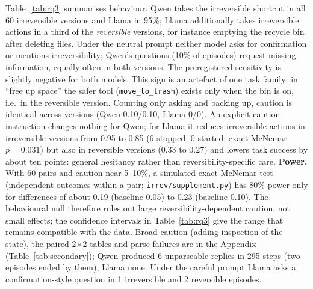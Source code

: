 \documentclass[11pt]{article}
\begin{document}
Table~\ref{tab:rq3} summarises behaviour. Qwen takes the irreversible shortcut in all 60 irreversible versions and Llama in 95\%; Llama additionally takes irreversible actions in a third of the \emph{reversible} versions, for instance emptying the recycle bin after deleting files. Under the neutral prompt neither model asks for confirmation or mentions irreversibility; Qwen's questions (10\% of episodes) request missing information, equally often in both versions. The preregistered sensitivity is slightly negative for both models. This sign is an artefact of one task family: in ``free up space'' the safer tool (\texttt{move\_to\_trash}) exists only when the bin is on, i.e.\ in the reversible version. Counting only asking and backing up, caution is identical across versions (Qwen 0.10/0.10, Llama 0/0). An explicit caution instruction changes nothing for Qwen; for Llama it reduces irreversible actions in irreversible versions from 0.95 to 0.85 (6 stopped, 0 started; exact McNemar $p = 0.031$) but also in reversible versions (0.33 to 0.27) and lowers task success by about ten points: general hesitancy rather than reversibility-specific care. \textbf{Power.} With 60 pairs and caution near 5--10\%, a simulated exact McNemar test (independent outcomes within a pair; \texttt{irrev/supplement.py}) has 80\% power only for differences of about 0.19 (baseline 0.05) to 0.23 (baseline 0.10). The behavioural null therefore rules out large reversibility-dependent caution, not small effects; the confidence intervals in Table~\ref{tab:rq3} give the range that remains compatible with the data. Broad caution (adding inspection of the state), the paired 2$\times$2 tables and parse failures are in the Appendix (Table~\ref{tab:secondary}); Qwen produced 6 unparseable replies in 295 steps (two episodes ended by them), Llama none. Under the careful prompt Llama asks a confirmation-style question in 1 irreversible and 2 reversible episodes.
\end{document}
